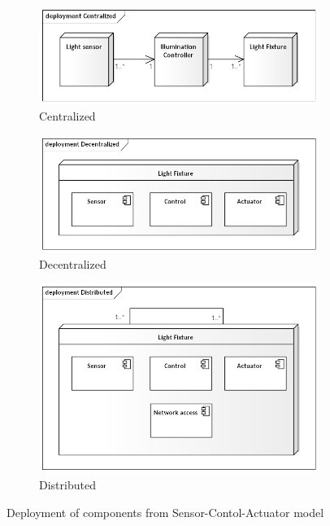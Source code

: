 \documentclass[11pt, english, a4paper, twoside]{article}
\begin{document}
\begin{figure}
	\centering
     \begin{subfigure}[b]{0.45\textwidth}
         \centering
         \includegraphics[width=\textwidth]{Centralized-arch.png}
         \caption{Centralized}
         \label{fig:centralized-arch}
     \end{subfigure}
     \hfill
     \begin{subfigure}[b]{0.45\textwidth}
         \centering
         \includegraphics[width=\textwidth]{Decentralized-arch.png}
         \caption{Decentralized}
         \label{fig:decentralized-arch}
     \end{subfigure}
     \hfill
     \begin{subfigure}[b]{0.35\textwidth}
         \centering
         \includegraphics[width=\textwidth]{Distributed-arch.png}
         \caption{Distributed}
         \label{fig:distributed-arch}
     \end{subfigure}
     \caption{Deployment of components from Sensor-Contol-Actuator model}
\end{figure}
\end{document}
